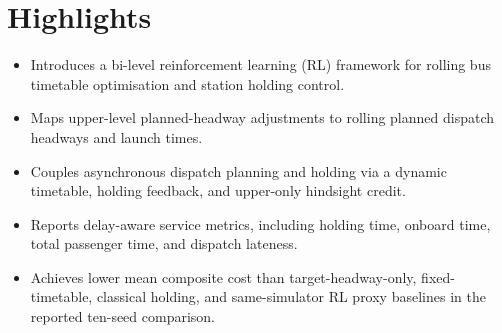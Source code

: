 
\section*{Highlights}

\begin{itemize}[leftmargin=*]
  \item Introduces a bi-level reinforcement learning (RL) framework for rolling bus timetable optimisation and station holding control.
  \item Maps upper-level planned-headway adjustments to rolling planned dispatch headways and launch times.
  \item Couples asynchronous dispatch planning and holding via a dynamic timetable, holding feedback, and upper-only hindsight credit.
  \item Reports delay-aware service metrics, including holding time, onboard time, total passenger time, and dispatch lateness.
  \item Achieves lower mean composite cost than target-headway-only, fixed-timetable, classical holding, and same-simulator RL proxy baselines in the reported ten-seed comparison.
\end{itemize}
